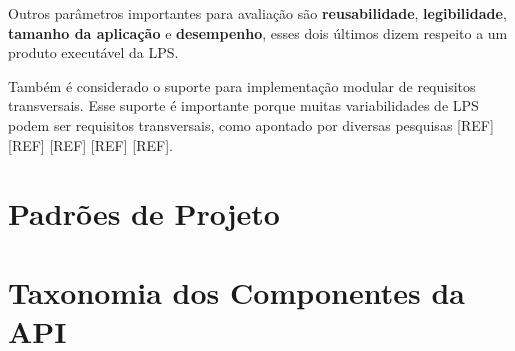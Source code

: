 Outros parâmetros importantes para avaliação são \textbf{reusabilidade}, \textbf{legibilidade},
\textbf{tamanho da aplicação} e \textbf{desempenho}, esses dois últimos dizem
respeito a um produto executável da LPS.

Também é considerado o suporte para implementação modular de requisitos transversais.
Esse suporte é importante porque muitas variabilidades de LPS podem ser requisitos
transversais, como apontado por diversas pesquisas [REF] [REF] [REF] [REF] [REF].

\section{Padrões de Projeto} \label{sec:padroe-projeto}

\section{Taxonomia dos Componentes da API} \label{sec:taxonomia}



